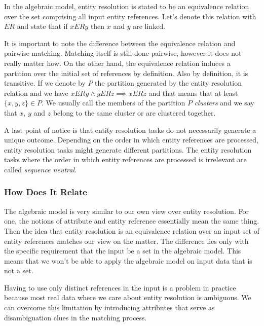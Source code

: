 \documentclass[11pt]{article}
\begin{document}
    In the algebraic model, entity resolution is stated to be an equivalence
    relation over the set comprising all input entity references.
    Let's denote this relation with $ER$ and state that if $xERy$ then $x$ and $y$
    are linked\cite{Tal11}.

    It is important to note the difference between the equivalence relation and
    pairwise matching.
    Matching itself is still done pairwise, however it does not really matter
    how.
    On the other hand, the equivalence relation induces a partition over the
    initial set of references by definition.
    Also by definition, it is transitive.
    If we denote by $P$ the partition generated by the entity resolution
    relation and we have $xERy \land yERz \implies xERz$ and that means that 
    at least $\{x, y, z\} \in P$.
    We usually call the members of the partition $P$ \textit{clusters} and we
    say that $x$, $y$ and $z$ belong to the same cluster or are clustered
    together.

    A last point of notice is that entity resolution tasks do not necessarily
    generate a unique outcome\cite{Tal11}.
    Depending on the order in which entity references are processed, entity
    resolution tasks might generate different partitions.
    The entity resolution tasks where the order in which entity references are
    processed is irrelevant are called \textit{sequence neutral}\cite{Tal11}.

    \subsubsection[algrel]{How Does It Relate}\label{subsubsec:algrel}

    The algebraic model is very similar to our own view over entity resolution.
    For one, the notions of attribute and entity reference essentially mean the
    same thing.
    Then the idea that entity resolution is an equivalence relation over an
    input set of entity references matches our view on the matter.
    The difference lies only with the specific requirement that the input be
    a set in the algebraic model.
    This means that we won't be able to apply the algebraic model on input data
    that is not a set.
    
    Having to use only distinct references in the input is a problem in practice
    because most real data where we care about entity resolution is ambiguous.
    We can overcome this limitation by introducing attributes that serve as
    disambiguation clues in the matching process.
\end{document}
